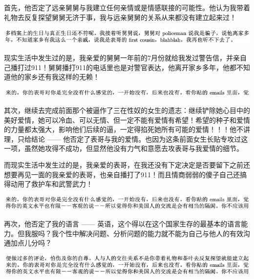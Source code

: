 \documentclass[9pt, b5paper]{article}
\begin{document}
首先，他否定了远亲舅舅与我建立任何亲情或是情感联接的可能性。他认为我带着礼物去反复探望舅舅无济于事，我与远亲舅舅的关系从来都没有建立起来过！

\begin{center}
\includegraphics[width=.9\linewidth]{./pic/backups_plans_20210417_231142.png}
\end{center}

现实生活中发生过的是，我亲爱的舅舅一年前的7月份就给我发过警告信，并亲自己播打过911！舅舅播打911的电话里也是对警官表达，他离开家乡多年，他都不知道他的家乡还有我这样的无赖！

\begin{center}
\includegraphics[width=.9\linewidth]{./pic/backups_plans_20210417_222518.png}
\end{center}

其次，继续去完成前面那个被逼作了三在性奴的女生的遗志：继续铲除她心目中的美好爱情，她可以冷血、可以无情、但一定不能有爱情有希望！希望的种子和爱情的力量都太强大，影响他们后续的逼，一定得掐死她所有可能的爱情！！！他不讲理，只给结论 —— 他否定了表哥与我的爱情。也因为这条前面女生长贴专攻过这一项，虽然她攻得不成功，但显然他没有力气和意愿去攻表哥与我爱情的细节。

而现实生活中发生过的是，我亲爱的表哥，在我还没有下定决定是否要留下之前还想要再见一面的我亲爱的表哥，也亲自播打了911！而且情商弱弱的傻子自己还搞得动用了救护车和武警武力！

\begin{center}
\includegraphics[width=.9\linewidth]{./pic/backups_plans_20210417_222852.png}
\end{center}

再次，他否定了我的语言 —— 英语，这个得以在这个国家生存的最基本的语言能力。但我服吗？我个性中解决问题、分析问题的能力就不能为自己与他人的有效沟通加点儿分吗？

\begin{center}
\includegraphics[width=.9\linewidth]{./pic/backups_plans_20210417_221601.png}
\end{center}
\end{document}
